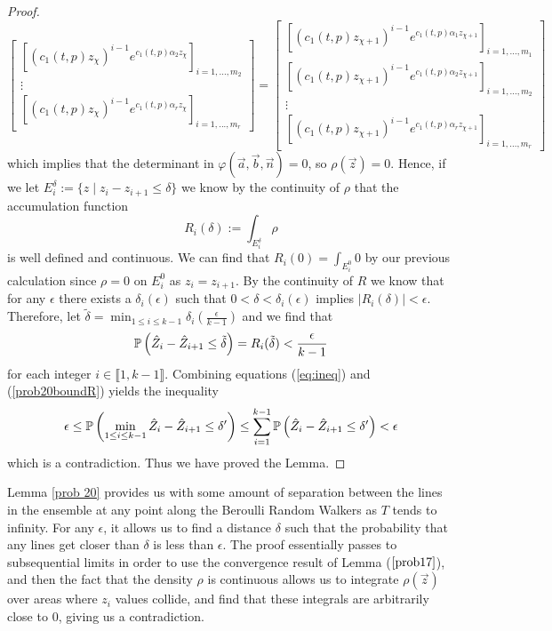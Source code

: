 \begin{proof}
\[\begin{bmatrix}
	\left[(c_1(t,p)z_\chi)^{i-1}e^{c_1(t,p)\alpha_2 z_\chi}\right]_{i=1,...,m_2}\\
	\vdots \\
	\left[(c_1(t,p)z_\chi)^{i-1}e^{c_1(t,p)\alpha_r z_\chi}\right]_{i=1,...,m_r}
	\end{bmatrix}=\begin{bmatrix}
	\left[(c_1(t,p)z_{\chi+1})^{i-1}e^{c_1(t,p)\alpha_1 z_{\chi+1}}\right]_{i=1,...,m_1}\\
	\left[(c_1(t,p)z_{\chi+1})^{i-1}e^{c_1(t,p)\alpha_2 z_{\chi+1}}\right]_{i=1,...,m_2}\\
	\vdots \\
	\left[(c_1(t,p)z_{\chi+1})^{i-1}e^{c_1(t,p)\alpha_r z_{\chi+1}}\right]_{i=1,...,m_r}
	\end{bmatrix}\]
	which implies that the determinant in $\varphi(\vec a,\vec b,\vec n)=0$, so $\rho(\vec z)=0$. Hence, if we let $E_i^\delta:=\{z\mid z_i-z_{i+1}\leq\delta\}$ we know by the continuity of $\rho$ that the accumulation function \[R_i(\delta):=\int_{E_i^\delta}\rho\] is well defined and continuous. We can find that $R_i(0)=\int_{E_i^0} 0$ by our previous calculation since $\rho=0$ on $E_i^0$ as $z_i=z_{i+1}$. By the continuity of $R$ we know that for any $\epsilon$ there exists a $\delta_i(\epsilon)$ such that $0<\delta<\delta_i(\epsilon)$ implies $|R_i(\delta)|<\epsilon$. Therefore, let $\tilde\delta=\min_{1\leq i\leq k-1}\delta_i\left(\frac\epsilon{k-1}\right)$ and we find that 
	\begin{equation}
	\label{prob20boundR}
	\mathbb{P}\left( \hat Z_i-\hat Z_{i+1}\leq\tilde\delta \right)=R_i(\tilde\delta)<\frac{\epsilon}{k-1}
	\end{equation}
	for each integer $i\in \llbracket 1,k-1\rrbracket$. Combining equations (\ref{eq:ineq}) and (\ref{prob20boundR}) yields the inequality 
	\[\epsilon\leq \mathbb{P}\left(\min_{1\leq i\leq k-1} \hat Z_i-\hat Z_{i+1}\leq\delta'\right)\leq \sum_{i=1}^{k-1}\mathbb{P}\left(\hat Z_i-\hat Z_{i+1}\leq \delta'\right)< \epsilon
	\]
	which is a contradiction. Thus we have proved the Lemma.
\end{proof}
\begin{remark}
	Lemma \ref{prob 20} provides us with some amount of separation between the lines in the ensemble at any point along the Beroulli Random Walkers as $T$ tends to infinity. For any $\epsilon$, it allows us to find a distance $\delta$ such that the probability that any lines get closer than $\delta$ is less than $\epsilon$. The proof essentially passes to subsequential limits in order to use the convergence result of Lemma ($\ref{prob17}$), and then the fact that the density $\rho$ is continuous allows us to integrate $\rho(\vec z)$ over areas where $z_i$ values collide, and find that these integrals are arbitrarily close to $0$, giving us a contradiction.
\end{remark}
